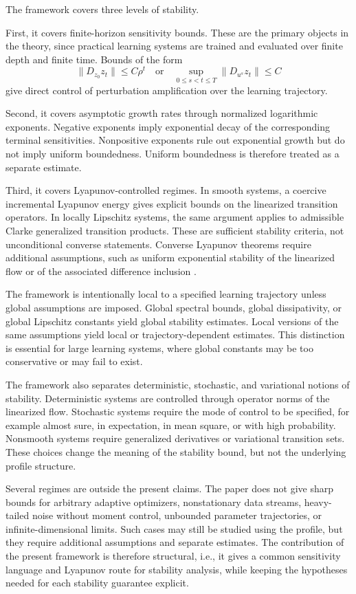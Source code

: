 \documentclass{article}
\numberwithin{equation}{section}
\begin{document}
The framework covers three levels of stability.

First, it covers finite-horizon sensitivity bounds. These are the primary objects in the theory, since practical learning systems are trained and evaluated over finite depth and finite time. Bounds of the form
\[
\|D_{z_0}z_t\|\le C\rho^t
\quad\text{or}\quad
\sup_{0\le s<t\le T}\|D_{u^s}z_t\|\le C
\] give direct control of perturbation amplification over the learning trajectory.

Second, it covers asymptotic growth rates through normalized logarithmic exponents. Negative exponents imply exponential decay of the corresponding terminal sensitivities. Nonpositive exponents rule out exponential growth but do not imply uniform boundedness. Uniform boundedness is therefore treated as a separate estimate.

Third, it covers Lyapunov-controlled regimes. In smooth systems, a coercive incremental Lyapunov energy gives explicit bounds on the linearized transition operators. In locally Lipschitz systems, the same argument applies to admissible Clarke generalized transition products. These are sufficient stability criteria, not unconditional converse statements. Converse Lyapunov theorems require additional assumptions, such as uniform exponential stability of the linearized flow or of the associated difference inclusion \cite{Khalil2002Nonlinear,Angeli2002Incremental,Clarke1998Nonsmooth}.

The framework is intentionally local to a specified learning trajectory unless global assumptions are imposed. Global spectral bounds, global dissipativity, or global Lipschitz constants yield global stability estimates. Local versions of the same assumptions yield local or trajectory-dependent estimates. This distinction is essential for large learning systems, where global constants may be too conservative or may fail to exist.

The framework also separates deterministic, stochastic, and variational notions of stability. Deterministic systems are controlled through operator norms of the linearized flow. Stochastic systems require the mode of control to be specified, for example almost sure, in expectation, in mean square, or with high probability. Nonsmooth systems require generalized derivatives or variational transition sets. These choices change the meaning of the stability bound, but not the underlying profile structure.

Several regimes are outside the present claims. The paper does not give sharp bounds for arbitrary adaptive optimizers, nonstationary data streams, heavy-tailed noise without moment control, unbounded parameter trajectories, or infinite-dimensional limits. Such cases may still be studied using the profile, but they require additional assumptions and separate estimates. The contribution of the present framework is therefore structural, i.e., it gives a common sensitivity language and Lyapunov route for stability analysis, while keeping the hypotheses needed for each stability guarantee explicit.
\end{document}
